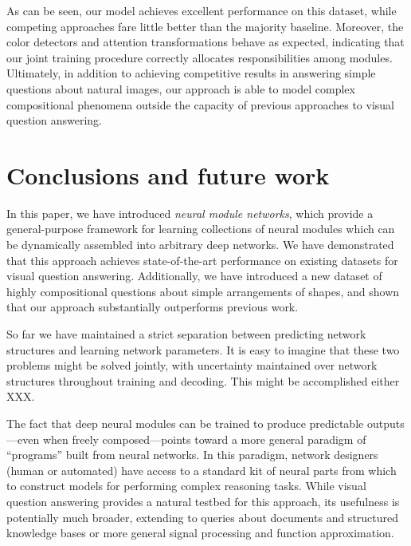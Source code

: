 \documentclass[10pt,twocolumn,letterpaper]{article}
\begin{document}
As can be seen, our model achieves excellent performance on this dataset, while
competing approaches fare little better than the majority baseline. Moreover,
the color detectors and attention transformations behave as expected, indicating
that our joint training procedure correctly allocates responsibilities among
modules. Ultimately, in addition to achieving competitive results in answering
simple questions about natural images, our approach is able to model complex
compositional phenomena outside the capacity of previous approaches to visual
question answering.

\section{Conclusions and future work}

In this paper, we have introduced \emph{neural module networks}, which provide a
general-purpose framework for learning collections of neural modules which can
be dynamically assembled into arbitrary deep networks. We have demonstrated that
this approach achieves state-of-the-art performance on existing datasets for
visual question answering. Additionally, we have introduced a new dataset of
highly compositional questions about simple arrangements of shapes, and shown
that our approach substantially outperforms previous work.

So far we have maintained a strict separation between predicting network
structures and learning network parameters. It is easy to imagine that these two
problems might be solved jointly, with uncertainty maintained over network
structures throughout training and decoding. This might be accomplished either
XXX.

The fact that deep neural modules can be trained to produce predictable
outputs---even when freely composed---points toward a more general paradigm of
``programs'' built from neural networks. In this paradigm, network designers
(human or automated) have access to a standard kit of neural parts from which to
construct models for performing complex reasoning tasks. While visual question
answering provides a natural testbed for this approach, its usefulness is
potentially much broader, extending to queries about documents and structured
knowledge bases or more general signal processing and function approximation.

\small


\end{document}
